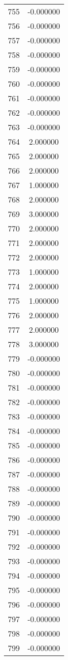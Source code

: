 \documentclass[12pt]{article}
\begin{document}
\begin{longtable}{@{}cc@{}}
755 & -0.000000 \\
756 & -0.000000 \\
757 & -0.000000 \\
758 & -0.000000 \\
759 & -0.000000 \\
760 & -0.000000 \\
761 & -0.000000 \\
762 & -0.000000 \\
763 & -0.000000 \\
764 & 2.000000 \\
765 & 2.000000 \\
766 & 2.000000 \\
767 & 1.000000 \\
768 & 2.000000 \\
769 & 3.000000 \\
770 & 2.000000 \\
771 & 2.000000 \\
772 & 2.000000 \\
773 & 1.000000 \\
774 & 2.000000 \\
775 & 1.000000 \\
776 & 2.000000 \\
777 & 2.000000 \\
778 & 3.000000 \\
779 & -0.000000 \\
780 & -0.000000 \\
781 & -0.000000 \\
782 & -0.000000 \\
783 & -0.000000 \\
784 & -0.000000 \\
785 & -0.000000 \\
786 & -0.000000 \\
787 & -0.000000 \\
788 & -0.000000 \\
789 & -0.000000 \\
790 & -0.000000 \\
791 & -0.000000 \\
792 & -0.000000 \\
793 & -0.000000 \\
794 & -0.000000 \\
795 & -0.000000 \\
796 & -0.000000 \\
797 & -0.000000 \\
798 & -0.000000 \\
799 & -0.000000 \\

\end{longtable}
\end{document}
